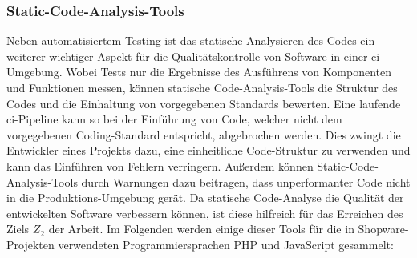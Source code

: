 \subsubsection{Static-Code-Analysis-Tools}

Neben automatisiertem Testing ist das statische Analysieren des Codes ein weiterer wichtiger Aspekt für die
Qualitätskontrolle von Software in einer \acrshort{ci}-Umgebung.
Wobei Tests nur die Ergebnisse des Ausführens von Komponenten und Funktionen messen, können statische
Code-Analysis-Tools die Struktur des Codes und die Einhaltung von vorgegebenen Standards bewerten.
Eine laufende \acrshort{ci}-Pipeline kann so bei der Einführung von Code, welcher nicht dem vorgegebenen Coding-Standard
entspricht, abgebrochen werden.
Dies zwingt die Entwickler eines Projekts dazu, eine einheitliche Code-Struktur zu verwenden und kann das Einführen
von Fehlern verringern.
Außerdem können Static-Code-Analysis-Tools durch Warnungen dazu beitragen, dass unperformanter Code nicht in die
Produktions-Umgebung gerät.
Da statische Code-Analyse die Qualität der entwickelten Software verbessern können, ist diese hilfreich für das
Erreichen des Ziels $Z_2$ der Arbeit.
Im Folgenden werden einige dieser Tools für die in Shopware-Projekten verwendeten Programmiersprachen PHP und JavaScript
gesammelt:


